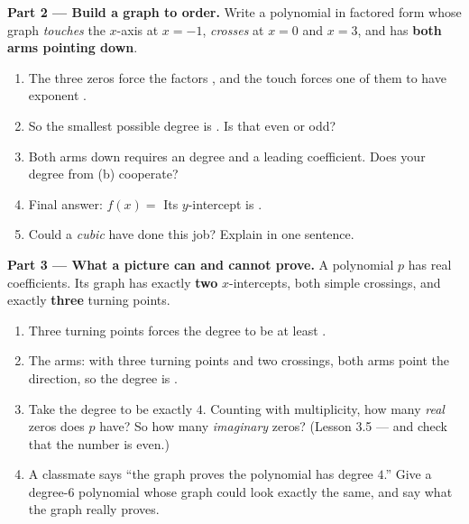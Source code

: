 \documentclass[10pt]{article}
\begin{document}
\begin{tcolorbox}[colback=white, colframe=black!40, title=\textbf{Tier E --- Extension},
    fonttitle=\bfseries, arc=1.5mm, left=3mm, right=3mm, top=2mm, bottom=2mm, breakable]
\vspace{5pt}
\textbf{Part 2 --- Build a graph to order.} Write a polynomial in factored form whose graph
\emph{touches} the $x$-axis at $x=-1$, \emph{crosses} at $x=0$ and $x=3$, and has \textbf{both arms
pointing down}.
\begin{enumerate}[label=(\alph*), leftmargin=1.8em, itemsep=6pt]
  \item The three zeros force the factors , and the touch forces one of them to have
        exponent .
  \item So the smallest possible degree is . Is that even or odd? 
  \item Both arms down requires an  degree and a  leading coefficient.
        Does your degree from (b) cooperate? 
  \item Final answer: $f(x) = $  \quad Its $y$-intercept is .
  \item Could a \emph{cubic} have done this job?  \; Explain in one sentence.
\end{enumerate}

\vspace{5pt}
\textbf{Part 3 --- What a picture can and cannot prove.} A polynomial $p$ has real coefficients. Its
graph has exactly \textbf{two} $x$-intercepts, both simple crossings, and exactly \textbf{three}
turning points.
\begin{enumerate}[label=(\alph*), leftmargin=1.8em, itemsep=6pt]
  \item Three turning points forces the degree to be at least .
  \item The arms: with three turning points and two crossings, both arms point the 
        direction, so the degree is .
  \item Take the degree to be exactly $4$. Counting with multiplicity, how many \emph{real} zeros
        does $p$ have?  \; So how many \emph{imaginary} zeros?  \;
        (Lesson 3.5 --- and check that the number is even.)
  \item A classmate says ``the graph proves the polynomial has degree $4$.'' Give a degree-$6$
        polynomial whose graph could look exactly the same, and say what the graph really proves.
\end{enumerate}
\end{tcolorbox}
\end{document}
